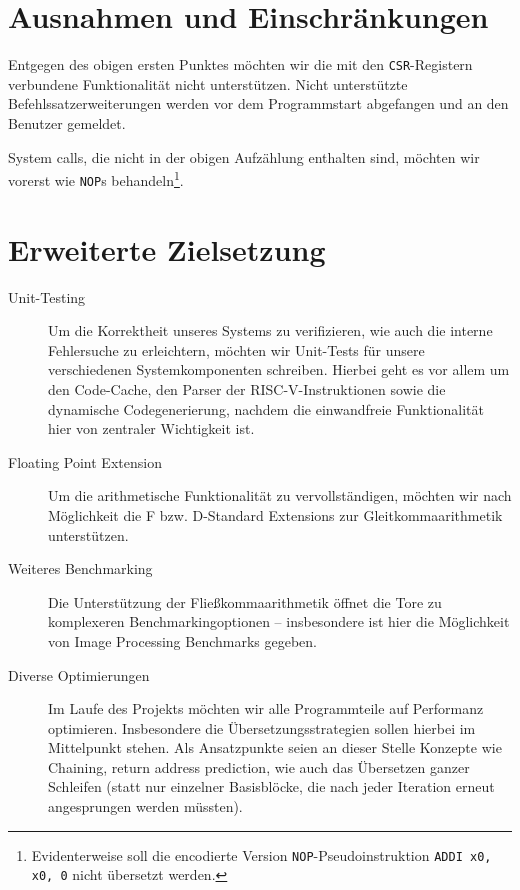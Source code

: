 \documentclass{article}
\begin{document}
\section*{Ausnahmen und Einschränkungen}
Entgegen des obigen ersten Punktes möchten wir die mit den \verb!CSR!-Registern verbundene Funktionalität nicht unterstützen. Nicht unterstützte Befehlssatzerweiterungen werden vor dem Programmstart abgefangen und an den Benutzer gemeldet.

System calls, die nicht in der obigen Aufzählung enthalten sind, möchten wir vorerst wie \verb!NOP!s behandeln\footnote{Evidenterweise soll die encodierte Version \verb!NOP!-Pseudoinstruktion \verb!ADDI x0, x0, 0! nicht übersetzt werden.}.


\section*{Erweiterte Zielsetzung}

\begin{description}
	\item[Unit-Testing] Um die Korrektheit unseres Systems zu verifizieren, wie auch die interne Fehlersuche zu erleichtern, möchten wir Unit-Tests für unsere verschiedenen Systemkomponenten schreiben. Hierbei geht es vor allem um den Code-Cache, den Parser der RISC-V-Instruktionen sowie die dynamische Codegenerierung, nachdem die einwandfreie Funktionalität hier von zentraler Wichtigkeit ist.
	\item[Floating Point Extension] Um die arithmetische Funktionalität zu vervollständigen, möchten wir nach Möglichkeit die \glqq F\grqq{} bzw. \glqq D\grqq{}-Standard Extensions zur Gleitkommaarithmetik unterstützen.
	\item[Weiteres Benchmarking] Die Unterstützung der Fließkommaarithmetik öffnet die Tore zu komplexeren Benchmarkingoptionen -- insbesondere ist hier die Möglichkeit von Image Processing Benchmarks gegeben.
	\item[Diverse Optimierungen] Im Laufe des Projekts möchten wir alle Programmteile auf Performanz optimieren. Insbesondere die Übersetzungsstrategien sollen hierbei im Mittelpunkt stehen. Als Ansatzpunkte seien an dieser Stelle Konzepte wie Chaining, return address prediction, wie auch das Übersetzen ganzer Schleifen (statt nur einzelner Basisblöcke, die nach jeder Iteration erneut angesprungen werden müssten).
\end{description}
\end{document}

